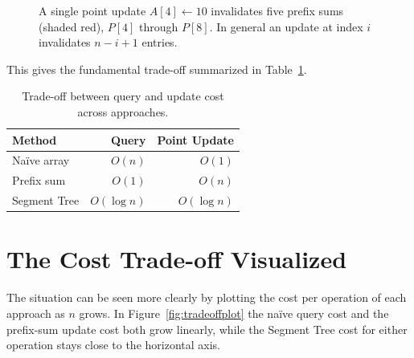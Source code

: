 \documentclass[
  11pt,
  a4paper,
  twoside=false,
  numbers=noenddot,
  headings=big,
  parskip=half,
  toc=bibliography,
  toc=listof,
  bibliography=totoc
]{scrreprt}
\begin{document}
\begin{figure}[h]
\centering
{}
\caption{A single point update $A[4]\leftarrow 10$ invalidates five prefix sums (shaded red), $P[4]$ through $P[8]$. In general an update at index $i$ invalidates $n-i+1$ entries.}
\label{fig:prefixupdate}
\end{figure}

This gives the fundamental trade-off summarized in Table~\ref{tab:tradeoff}.

\begin{table}[h]
\centering
\caption{Trade-off between query and update cost across approaches.}
\label{tab:tradeoff}
\begin{tabular}{lrr}
\toprule
\textbf{Method} & \textbf{Query} & \textbf{Point Update} \\
\midrule
Na\"ive array  & $O(n)$      & $O(1)$ \\
Prefix sum     & $O(1)$      & $O(n)$ \\
Segment Tree   & $O(\log n)$ & $O(\log n)$ \\
\bottomrule
\end{tabular}
\end{table}

\section{The Cost Trade-off Visualized}
The situation can be seen more clearly by plotting the cost per operation of each approach as $n$ grows. In Figure~\ref{fig:tradeoffplot} the na\"ive query cost and the prefix-sum update cost both grow linearly, while the Segment Tree cost for either operation stays close to the horizontal axis.
\end{document}
